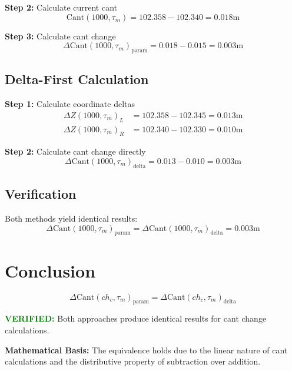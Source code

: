 \documentclass{article}
\begin{document}
\textbf{Step 2:} Calculate current cant
\begin{equation}
\text{Cant}(1000, \tau_m) = 102.358 - 102.340 = 0.018\text{m}
\end{equation}

\textbf{Step 3:} Calculate cant change
\begin{equation}
\Delta\text{Cant}(1000, \tau_m)_{\text{param}} = 0.018 - 0.015 = 0.003\text{m}
\end{equation}

\subsection{Delta-First Calculation}
\textbf{Step 1:} Calculate coordinate deltas
\begin{align}
\Delta Z(1000, \tau_m)_L &= 102.358 - 102.345 = 0.013\text{m} \\
\Delta Z(1000, \tau_m)_R &= 102.340 - 102.330 = 0.010\text{m}
\end{align}

\textbf{Step 2:} Calculate cant change directly
\begin{equation}
\Delta\text{Cant}(1000, \tau_m)_{\text{delta}} = 0.013 - 0.010 = 0.003\text{m}
\end{equation}

\subsection{Verification}
Both methods yield identical results:
\begin{equation}
\Delta\text{Cant}(1000, \tau_m)_{\text{param}} = \Delta\text{Cant}(1000, \tau_m)_{\text{delta}} = 0.003\text{m}
\end{equation}

\section{Conclusion}
\begin{equation}
\boxed{\Delta\text{Cant}(ch_c, \tau_m)_{\text{param}} = \Delta\text{Cant}(ch_c, \tau_m)_{\text{delta}}}
\end{equation}

\textcolor{green}{\textbf{VERIFIED:}} Both approaches produce identical results for cant change calculations.

\textbf{Mathematical Basis:} The equivalence holds due to the linear nature of cant calculations and the distributive property of subtraction over addition.
\end{document}
